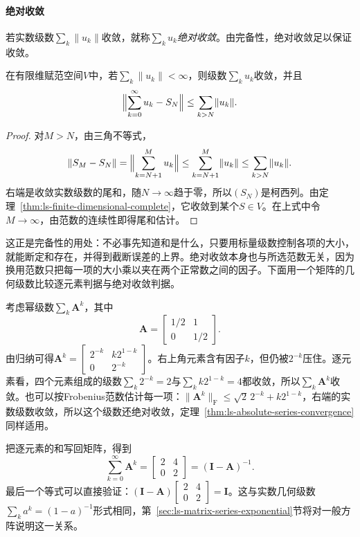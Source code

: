 \paragraph{绝对收敛}
若实数级数$\sum_k\lVert u_k\rVert$收敛，就称$\sum_ku_k$\emph{绝对收敛}。由完备性，绝对收敛足以保证收敛。
\begin{theorem}[绝对收敛的级数收敛]
\label{thm:ls-absolute-series-convergence}
在有限维赋范空间$V$中，若$\sum_k\lVert u_k\rVert<\infty$，则级数$\sum_ku_k$收敛，并且
\[
 \Bigl\lVert\sum_{k=0}^\infty u_k-S_N\Bigr\rVert\leq\sum_{k>N}\lVert u_k\rVert .
\]
\end{theorem}
\begin{proof}
对$M>N$，由三角不等式，
\[
 \lVert S_M-S_N\rVert=\Bigl\lVert\sum_{k=N+1}^Mu_k\Bigr\rVert\leq\sum_{k=N+1}^M\lVert u_k\rVert\leq\sum_{k>N}\lVert u_k\rVert .
\]
右端是收敛实数级数的尾和，随$N\to\infty$趋于零，所以$(S_N)$是柯西列。由定理~\ref{thm:ls-finite-dimensional-complete}，它收敛到某个$S\in V$。在上式中令$M\to\infty$，由范数的连续性即得尾和估计。
\end{proof}
这正是完备性的用处：不必事先知道和是什么，只要用标量级数控制各项的大小，就能断定和存在，并得到截断误差的上界。绝对收敛本身也与所选范数无关，因为换用范数只把每一项的大小乘以夹在两个正常数之间的因子。下面用一个矩阵的几何级数比较逐元素判据与绝对收敛判据。
\begin{example}[矩阵几何级数]
\label{ex:ls-matrix-geometric-series}
考虑幂级数$\sum_k\bm A^k$，其中
\[
 \bm A=\begin{bmatrix}1/2&1\\0&1/2\end{bmatrix}.
\]
由归纳可得$\bm A^k=\begin{bmatrix}2^{-k}&k2^{1-k}\\0&2^{-k}\end{bmatrix}$。右上角元素含有因子$k$，但仍被$2^{-k}$压住。逐元素看，四个元素组成的级数$\sum_k2^{-k}=2$与$\sum_kk2^{1-k}=4$都收敛，所以$\sum_k\bm A^k$收敛。也可以按Frobenius范数估计每一项：$\lVert\bm A^k\rVert_{\mathrm F}\leq\sqrt2\,2^{-k}+k2^{1-k}$，右端的实数级数收敛，所以这个级数还绝对收敛，定理~\ref{thm:ls-absolute-series-convergence}同样适用。

把逐元素的和写回矩阵，得到
\[
 \sum_{k=0}^\infty\bm A^k=\begin{bmatrix}2&4\\0&2\end{bmatrix}=(\bm I-\bm A)^{-1}.
\]
最后一个等式可以直接验证：$(\bm I-\bm A)\begin{bmatrix}2&4\\0&2\end{bmatrix}=\bm I$。这与实数几何级数$\sum_ka^k=(1-a)^{-1}$形式相同，第~\ref{sec:ls-matrix-series-exponential}节将对一般方阵说明这一关系。
\end{example}

